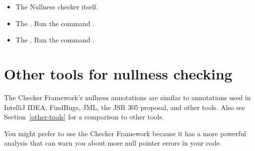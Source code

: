 \begin{itemize}
\item
The Nullness checker itself.

\item
The
.
Run the command .


\item
The
.
Run the command .

%
%
%

\end{itemize}


\section{Other tools for nullness checking\label{nullness-related-work}}

\newcommand{\linktoNonNull}{\code{\refclass{nullness/quals}{NonNull}}}
\newcommand{\linktoNullable}{\code{\refclass{nullness/quals}{Nullable}}}

The Checker Framework's nullness annotations are similar to annotations used
in IntelliJ IDEA, FindBugs, JML, the JSR 305 proposal, and other tools.  Also
see Section~\ref{other-tools} for a comparison to other tools.

You might prefer to use the Checker Framework because it has a more
powerful analysis that can warn you about more null pointer errors in your
code.

